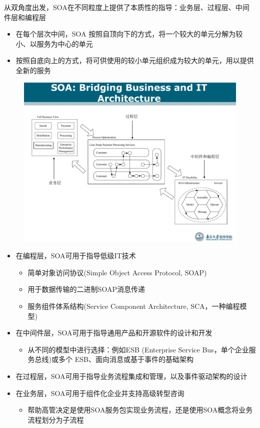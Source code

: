 从双角度出发，SOA在不同粒度上提供了本质性的指导：业务层、过程层、中间件层和编程层
\begin{itemize}
    \item 在每个层次中间，SOA 按照自顶向下的方式，将一个较大的单元分解为较小、以服务为中心的单元
    \item 按照自底向上的方式，将可供使用的较小单元组织成为较大的单元，用以提供全新的服务
\end{itemize}

\begin{figure}[H]
    \vspace{-0.5em}
	\centering
	\includegraphics[width=\textwidth]{images/SOA双角度.pdf}
    \vspace{-1em}
\end{figure}

\begin{itemize}
    \item 在编程层，SOA可用于指导低级IT技术
    \begin{itemize}
        \item 简单对象访问协议(Simple Object Access Protocol, SOAP)
        \item 用于数据传输的二进制SOAP消息传递
        \item 服务组件体系结构(Service Component Architecture, SCA，一种编程模型)
    \end{itemize}
    \item 在中间件层，SOA可用于指导通用产品和开源软件的设计和开发
    \begin{itemize}
        \item 从不同的模型中进行选择：例如ESB (Enterprise Service Bus，单个企业服务总线)或多个 ESB、面向消息或基于事件的基础架构
    \end{itemize}
    \item 在过程层，SOA可用于指导业务流程集成和管理，以及事件驱动架构的设计
    \item 在业务层，SOA可用于组件化企业并支持高级转型咨询
    \begin{itemize}
        \item 帮助高管决定是使用SOA服务包实现业务流程，还是使用SOA概念将业务流程划分为子流程
    \end{itemize}
\end{itemize}

